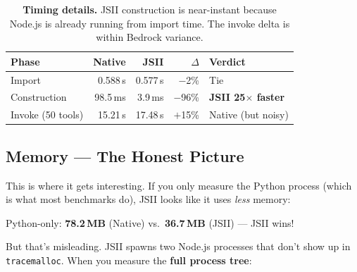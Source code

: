 \documentclass[11pt]{article}
\begin{document}
\begin{table}[H]
\centering
\renewcommand{\arraystretch}{1.25}
\begin{tabular}{@{}l r r r l@{}}
\toprule
\textbf{Phase} & \textbf{Native} & \textbf{JSII} & \textbf{$\Delta$} & \textbf{Verdict} \\
\midrule
Import & 0.588\,s & 0.577\,s & $-$2\% & \cellcolor{codebg}Tie \\
Construction & 98.5\,ms & 3.9\,ms & \cellcolor{nativelt}$-$96\% & \cellcolor{nativelt}\textbf{JSII 25$\times$ faster} \\
Invoke (50 tools) & 15.21\,s & 17.48\,s & \cellcolor{jsiilt}$+$15\% & \cellcolor{jsiilt}Native (but noisy) \\
\bottomrule
\end{tabular}
\caption{\textbf{Timing details.} JSII construction is near-instant because Node.js is already running from import time. The invoke delta is within Bedrock variance.}
\end{table}

\subsection{Memory — The Honest Picture}

This is where it gets interesting. If you only measure the Python process (which is what most benchmarks do), JSII looks like it uses \textit{less} memory:

\begin{center}
\sffamily Python-only: \textcolor{nativegreen}{\textbf{78.2\,MB}} (Native) vs.\ \textcolor{jsiipurple}{\textbf{36.7\,MB}} (JSII) — JSII wins!
\end{center}

But that's misleading. JSII spawns two Node.js processes that don't show up in \texttt{tracemalloc}. When you measure the \textbf{full process tree}:
\end{document}
